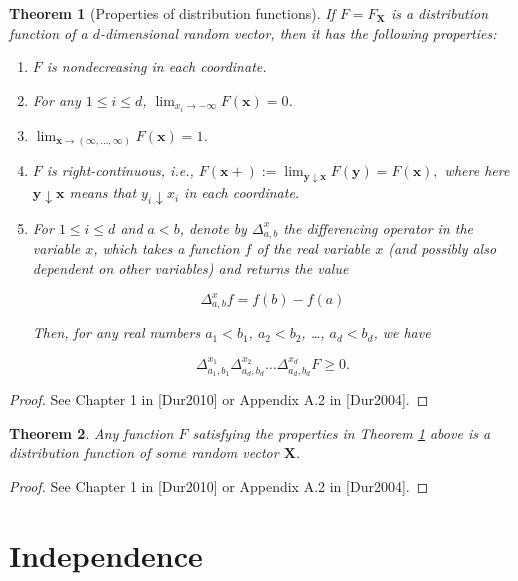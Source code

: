 \documentclass[11pt]{report}
\theoremstyle{plain}
\newtheorem{thm}{Theorem}[chapter]
\theoremstyle{definition}
\begin{document}
\begin{thm}[Properties of distribution functions]
\label{thm-multidim}
If $F=F_{\mathbf X}$ is a distribution function of a
$d$-dimensional random vector, then it has the
following properties:

\begin{enumerate}[label=(\roman*)]
\item $F$ is nondecreasing in each coordinate.

\item For any $1\le i\le d$,
$\lim_{x_i\to-\infty} F(\mathbf{x}) = 0$.

\item $\lim_{\mathbf{x}\to(\infty,\ldots,\infty)}
F(\mathbf{x}) = 1$.

\item $F$ is right-continuous, i.e.,
$F(\mathbf{x}+) := \lim_{\mathbf{y}\downarrow
\mathbf{x}} F(\mathbf{y}) = F(\mathbf{x}),$
where here $\mathbf{y}\downarrow \mathbf{x}$ means
that $y_i\downarrow x_i$ in each coordinate.

\item For $1\le i\le d$ and $a<b$, denote by
$\Delta_{a,b}^{x}$ the \emph{differencing operator in the
variable $x$}, which takes a function $f$ of the real
variable $x$ (and possibly also dependent on other
variables) and returns the value

\[
\Delta_{a,b}^{x}f = f(b) - f(a)
\]

Then, for any real numbers $a_1 < b_1$, $a_2<b_2$,
\ldots, $a_d < b_d$, we have

\[
\Delta^{x_1}_{a_1,b_1} \Delta^{x_2}_{a_d,b_d}
\ldots \Delta^{x_d}_{a_d,b_d} F \ge 0.
\]
\end{enumerate}

\end{thm}

\begin{proof}
See Chapter 1 in [Dur2010] or Appendix A.2 in
[Dur2004].
\end{proof}

\begin{thm}
Any function $F$ satisfying the properties in Theorem
\ref{thm-multidim} above is a distribution function of
some random vector $\mathbf{X}$.
\end{thm}

\begin{proof}
See Chapter 1 in [Dur2010] or Appendix A.2 in
[Dur2004].
\end{proof}

\section{Independence}
\end{document}
